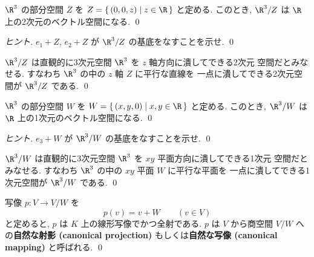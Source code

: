 \documentclass[12pt,twoside]{jarticle}
\begin{document}

\begin{question}[10点]
  \label{q:R^3/Z}
  $\R^3$ の部分空間 $Z$ を $Z=\{\,(0,0,z)\mid z\in\R\,\}$ と定める.
  このとき, $\R^3/Z$ は $\R$ 上の2次元のベクトル空間になる.
  \qed
\end{question}

\begin{proof}[ヒント]
  $e_1+Z$, $e_2+Z$ が $\R^3/Z$ の基底をなすことを示せ. \qed
\end{proof}

\begin{rem}
  $\R^3/Z$ は直観的に3次元空間 $\R^3$ を $z$ 軸方向に潰してできる2次元
  空間だとみなせる. すなわち $\R^3$ の中の $z$ 軸 $Z$ に平行な直線を
  一点に潰してできる2次元空間が $\R^3/Z$ である.
  \qed
\end{rem}


\begin{question}[10点]
  \label{q:R^3/W}
  $\R^3$ の部分空間 $W$ を $W=\{\,(x,y,0)\mid x,y\in\R\,\}$ と定める.
  このとき, $\R^3/W$ は $\R$ 上の1次元のベクトル空間になる.
  \qed
\end{question}

\begin{proof}[ヒント]
  $e_3+W$ が $\R^3/W$ の基底をなすことを示せ. \qed
\end{proof}

\begin{rem}
  $\R^3/W$ は直観的に3次元空間 $\R^3$ を $xy$ 平面方向に潰してできる1次元
  空間だとみなせる. すなわち $\R^3$ の中の $xy$ 平面 $W$ に平行な平面を
  一点に潰してできる1次元空間が $\R^3/W$ である.
  \qed
\end{rem}


\begin{question}[自然な射影, 5点]
  写像 $p:V\to V/W$ を
  \begin{equation*}
    p(v) = v+W \qquad (v\in V)
  \end{equation*}
  と定めると, $p$ は $K$ 上の線形写像でかつ全射である.
  $p$ は $V$ から商空間 $V/W$ への{\bf 自然な射影 (canonical projection)} 
  もしくは{\bf 自然な写像 (canonical mapping)} と呼ばれる.
  \qed
\end{question}

\end{document}
